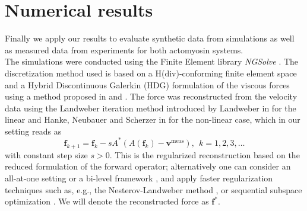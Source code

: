 \documentclass[final,leqno]{scrarticle}
\begin{document}
\section{Numerical results} \label{Sec:Numerics}
Finally we apply our results to evaluate synthetic data from simulations as well as measured data from experiments for both actomyosin systems. \\
The simulations were conducted using the Finite Element library \textit{NGSolve} \cite{ngsolve2, ngsolve1}. The discretization method used is based on a H(div)-conforming finite element space and a Hybrid Discontinuous Galerkin (HDG) formulation of the viscous forces using a method proposed in \cite{Lehrenfeld2018} and \cite{Leh16}.
The force was reconstructed from the velocity data using the Landweber iteration method introduced by Landweber in \cite{Landweber1951} for the linear and Hanke, Neubauer and Scherzer in \cite{Han95} for the non-linear case, which in our setting reads as
\begin{equation}
\label{reduced}
\mathbf{f}_{k+1} = \mathbf{f}_k - s A^{*}\left(A(\mathbf{f}_k)-\mathbf{v}^{\operatorname{meas}}\right), \ \ k = 1, 2, 3,\dots
\end{equation}
with constant step size $s>0$.
This is the regularized reconstruction based on the reduced formulation of the forward operator; alternatively one can consider an all-at-one setting \cite{Kaltenbacher:17, Tram19} or a bi-level framework \cite{Tram24, Tram25}, and apply faster regularization techniques such as, e.g., %
the Nesterov-Landweber method \cite{Neubauer17}, or sequential subspace optimization \cite{bhw20,ws16}. We will denote the reconstructed force as $\mathbf{f}^*$.
\end{document}
